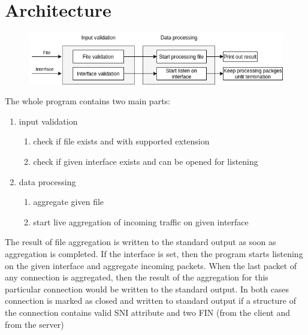 \documentclass[12pt,a4paper]{article}
\begin{document}
    \section{Architecture}
    \begin{center}
        \begin{figure}[h!]
            \includegraphics[scale=0.7]{sslsniff.png}
        \end{figure}
    \end{center}
    The whole program contains two main parts:
    \begin{enumerate}
        \item input validation
        \begin{enumerate}
            \item check if file exists and with supported extension
            \item check if given interface exists and can be opened for listening
        \end{enumerate}
        \item data processing
        \begin{enumerate}
            \item aggregate given file
            \item start live aggregation of incoming traffic on given interface
        \end{enumerate}
    \end{enumerate}
    The result of file aggregation is written to the standard output as soon as
    aggregation is completed. If the interface is set, then the program starts 
    listening on the given interface and aggregate incoming packets. When the 
    last packet of any connection is aggregated, then the result of the 
    aggregation for this particular connection would be written to the standard 
    output. In both cases connection is marked as closed and written to standard
    output if a structure of the connection contains valid SNI attribute and 
    two FIN (from the client and from the server)  
\end{document}
